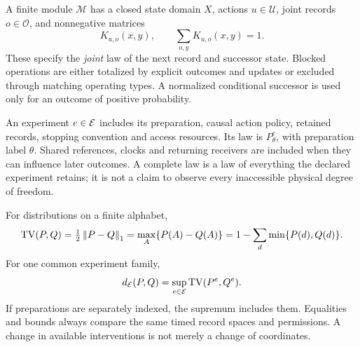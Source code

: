 A finite module \(\mathcal M\) has a closed state domain \(X\), actions \(u\in\mathcal U\), joint records \(o\in\mathcal O\), and nonnegative matrices
\begin{equation}\label{eq:instrument}
 K_{u,o}(x,y),\qquad \sum_{o,y}K_{u,o}(x,y)=1.
\end{equation}
These specify the \emph{joint} law of the next record and successor state. Blocked operations are either totalized by explicit outcomes and updates or excluded through matching operating types. A normalized conditional successor is used only for an outcome of positive probability.

An experiment \(e\in\mathcal E\) includes its preparation, causal action policy, retained records, stopping convention and access resources. Its law is \(P^e_\theta\), with preparation label \(\theta\). Shared references, clocks and returning receivers are included when they can influence later outcomes. A complete law is a law of everything the declared experiment retains; it is not a claim to observe every inaccessible physical degree of freedom.

For distributions on a finite alphabet,
\begin{equation}\label{eq:tv}
 \operatorname{TV}(P,Q)=\tfrac12\left\lVert P-Q\right\rVert_1
 =\max_A\{P(A)-Q(A)\}
 =1-\sum_d\min\{P(d),Q(d)\}.
\end{equation}
For one common experiment family,
\begin{equation}\label{eq:lawmetric}
 d_{\mathcal E}(P,Q)=\sup_{e\in\mathcal E}\operatorname{TV}(P^e,Q^e).
\end{equation}
If preparations are separately indexed, the supremum includes them. Equalities and bounds always compare the same timed record spaces and permissions. A change in available interventions is not merely a change of coordinates.

